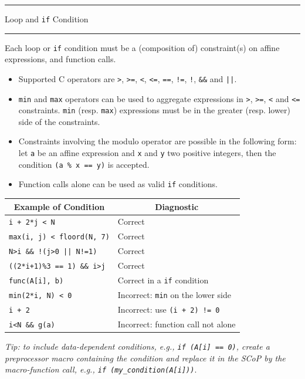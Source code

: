 \documentclass[landscape,a4paper]{article}
\def\titre#1{\begin{center}\hrule\vspace{0.1cm}#1
\vspace{0.07cm}\hrule\end{center}}
\begin{document}
\begin{multicols}{3}
\titre{Loop and {\tt if} Condition}

\begin{small}
Each loop or {\tt if} condition must be a (composition of) constraint(s) on
affine expressions, and function calls.
\begin{itemize} %
\item Supported C operators are {\tt >}, {\tt >=}, {\tt <}, {\tt <=},
      {\tt ==}, {\tt !=}, {\tt !}, {\tt \&\&} and {\tt ||}.
\item {\tt min} and {\tt max} operators can be used to aggregate expressions
      in {\tt >}, {\tt >=}, {\tt <} and {\tt <=} constraints. {\tt min}
      (resp. {\tt max}) expressions must be in the greater (resp. lower)
      side of the constraints.
\item Constraints involving the modulo operator are possible in the following
      form: let {\tt a} be an affine expression and {\tt x} and {\tt y} two
      positive integers, then the condition {\tt (a \% x == y)} is accepted.
\item Function calls alone can be used as valid {\tt if} conditions.
\end{itemize}

\vspace{0.3cm}
\begin{tabular}{p{4cm}|p{4.39cm}}
\multicolumn{1}{c|}{Example of Condition} &\multicolumn{1}{c}{Diagnostic}\\
\hline
{\tt i + 2*j < N} & Correct\\
\hline
{\tt max(i, j) < floord(N, 7)} & Correct\\
\hline
{\tt N>i \&\& !(j>0 || N!=1)} & Correct\\
\hline
{\tt ((2*i+1)\%3 == 1) \&\& i>j} & Correct\\
\hline
{\tt func(A[i], b)} & Correct in a {\tt if} condition\\
\hline
\hline
{\tt min(2*i, N) < 0} & Incorrect: {\tt min} on the lower side\\
\hline
{\tt i + 2} & Incorrect: use {\tt (i + 2) != 0}\\
\hline
{\tt i<N \&\& g(a)} & Incorrect: function call not alone
\end{tabular}

\vspace{0.3cm}
\textit{Tip: to include data-dependent conditions, e.g.,
{\tt if (A[i] == 0)}, create a preprocessor macro containing
the condition and replace it in the SCoP by the macro-function call,
e.g., {\tt if (my\_condition(A[i]))}}.
\end{small}


\end{multicols}
\end{document}
